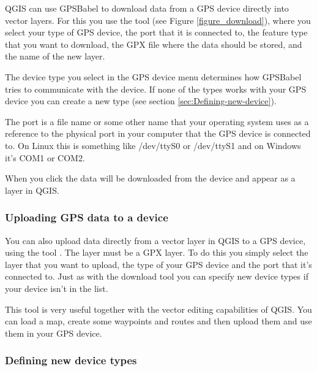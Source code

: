 QGIS can use GPSBabel to download data from a GPS device directly into vector layers.
For this you use the tool  (see Figure \ref{figure_download}), where you select your type
of GPS device, the port that it is connected to, the feature type that you want to download, the GPX file where the data should be stored, and the name of the new layer.



The device type you select in the GPS device menu determines how GPSBabel tries to communicate with the device.
If none of the types works with your GPS device you can create a new type (see section \ref{sec:Defining-new-device}).

The port is a file name or some other name that your operating system uses as a reference to the physical port in your computer that the GPS device is connected to.
\nix On Linux this is something like /dev/ttyS0 or /dev/ttyS1 and on \win Windows it's COM1 or COM2.

When you click  the data will be downloaded from the device and appear as a layer in QGIS.

\subsubsection{Uploading GPS data to a device}

You can also upload data directly from a vector layer in QGIS to a GPS device, using the tool .
The layer must be a GPX layer.
To do this you simply select the layer that you want to upload, the type of your GPS device and the port that it's connected to.
Just as with the download tool you can specify new device types if your device isn't in the list.

This tool is very useful together with the vector editing capabilities of QGIS.
You can load a map, create some waypoints and routes and then upload them and use them in your GPS device.

\subsubsection{\label{sec:Defining-new-device}Defining new device types}

